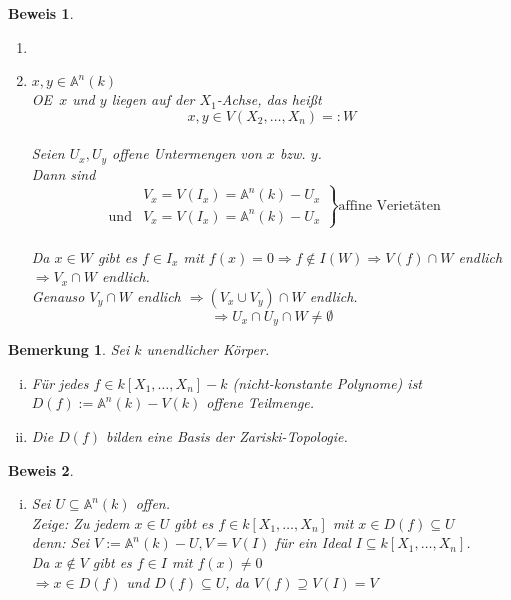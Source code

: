 \documentclass[a4paper,12pt]{report}
\theoremstyle{break}
\newtheorem{Bem}[Def]{Bemerkung}
\theoremstyle{nonumberbreak}
\newtheorem{Bew}{Beweis}
\theoremstyle{nonumberplain}
\newcommand{\A}{\mathbb{A}}
\renewcommand{\OE}{O\!\!E~}
\begin{document}
\begin{Bew}\begin{enumerate}[$n=1$:]
\item[$n=1$:] \checkmark
\item[{$n\ge 2$}:] $x,y \in \A ^n(k)$\\
	\OE $x$ und $y$ liegen auf der $X_1$-Achse, das hei\ss t \[x,y \in V(X_2,\dots ,X_n) =:W\]\\
	Seien $U_x,U_y$ offene Untermengen von $x$ bzw. $y$.\\
	Dann sind\[\left.
		\begin{array}{rl}
		 & V_x=V(I_x) = \A ^n(k)-U_x\\
		 \textrm{und} & V_x=V(I_x) = \A ^n(k)-U_x
		\end{array}	\right\} \textrm{affine Veriet\"aten}\]\\
	Da $x\in W$ gibt es $f\in I_x$ mit $f(x) = 0 \Rightarrow f \notin I(W) \Rightarrow V(f)\cap W$ endlich $	\Rightarrow V_x \cap W$ endlich.\\
	Genauso $V_y \cap W$ endlich
	$\Rightarrow (V_x \cup V_y)\cap W$ endlich.
	\[\Rightarrow U_x \cap U_y \cap W \not= \emptyset\]
\end{enumerate}\end{Bew}

\begin{Bem}\label{bem3.6}
Sei $k$ unendlicher K\"orper. \begin{enumerate}[i)]
\item
	F\"ur jedes $f \in k[X_1,\dots ,X_n]-k$ (nicht-konstante Polynome) ist $D(f):= \A ^n(k)-V(k)$ offene Teilmenge.
\item\label{bem3.6ii}
	Die $D(f)$ bilden eine Basis der Zariski-Topologie.
\end{enumerate}\end{Bem}

\begin{Bew}\begin{enumerate}[i)]
\item[ii)]
Sei $U \subseteq \A ^n(k)$ offen.\\
\emph{Zeige}: Zu jedem $x\in U$ gibt es $f\in k[X_1,\dots ,X_n]$ mit $x\in D(f) \subseteq U$\\
\emph{denn:} Sei $V:=\A ^n(k)-U, V=V(I)$ f\"ur ein Ideal $I \subseteq k[X_1,\dots ,X_n]$.\\
Da $x\notin V$ gibt es $f\in I$ mit $f(x) \not= 0$\\
$\Rightarrow x\in D(f)$ und $D(f) \subseteq U$, da $V(f) \supseteq V(I) =V$
\end{enumerate}\end{Bew}
\end{document}
